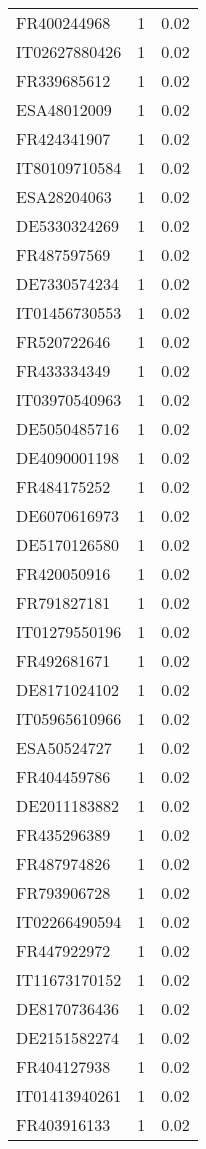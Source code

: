 \begin{table*}[htbp]
\begin{tabular}{lrr}
FR400244968 & 1 & 0.02 \\
IT02627880426 & 1 & 0.02 \\
FR339685612 & 1 & 0.02 \\
ESA48012009 & 1 & 0.02 \\
FR424341907 & 1 & 0.02 \\
IT80109710584 & 1 & 0.02 \\
ESA28204063 & 1 & 0.02 \\
DE5330324269 & 1 & 0.02 \\
FR487597569 & 1 & 0.02 \\
DE7330574234 & 1 & 0.02 \\
IT01456730553 & 1 & 0.02 \\
FR520722646 & 1 & 0.02 \\
FR433334349 & 1 & 0.02 \\
IT03970540963 & 1 & 0.02 \\
DE5050485716 & 1 & 0.02 \\
DE4090001198 & 1 & 0.02 \\
FR484175252 & 1 & 0.02 \\
DE6070616973 & 1 & 0.02 \\
DE5170126580 & 1 & 0.02 \\
FR420050916 & 1 & 0.02 \\
FR791827181 & 1 & 0.02 \\
IT01279550196 & 1 & 0.02 \\
FR492681671 & 1 & 0.02 \\
DE8171024102 & 1 & 0.02 \\
IT05965610966 & 1 & 0.02 \\
ESA50524727 & 1 & 0.02 \\
FR404459786 & 1 & 0.02 \\
DE2011183882 & 1 & 0.02 \\
FR435296389 & 1 & 0.02 \\
FR487974826 & 1 & 0.02 \\
FR793906728 & 1 & 0.02 \\
IT02266490594 & 1 & 0.02 \\
FR447922972 & 1 & 0.02 \\
IT11673170152 & 1 & 0.02 \\
DE8170736436 & 1 & 0.02 \\
DE2151582274 & 1 & 0.02 \\
FR404127938 & 1 & 0.02 \\
IT01413940261 & 1 & 0.02 \\
FR403916133 & 1 & 0.02 \\

\end{tabular}
\end{table*}
